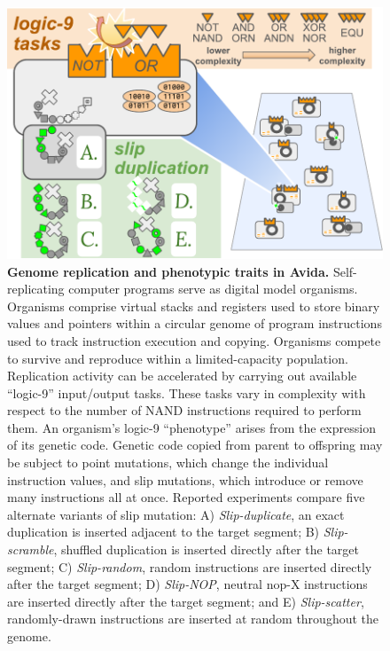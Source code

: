 \begin{figure}[!ht]
\centering
\includegraphics[width=\linewidth]{imgs/GeneDupeOps.pdf}
\caption{%
\textbf{Genome replication and phenotypic traits in Avida.}
\footnotesize
Self-replicating computer programs serve as digital model organisms.
Organisms comprise virtual stacks and registers used to store binary values and pointers within a circular genome of program instructions used to track instruction execution and copying.
Organisms compete to survive and reproduce within a limited-capacity population.
Replication activity can be accelerated by carrying out available ``logic-9'' input/output tasks.
These tasks vary in complexity with respect to the number of NAND instructions required to perform them.
An organism's logic-9 ``phenotype'' arises from the expression of its genetic code.
Genetic code copied from parent to offspring may be subject to point mutations, which change the individual instruction values, and slip mutations, which introduce or remove many instructions all at once.
Reported experiments compare five alternate variants of slip mutation:
A) \textit{Slip-duplicate}, an exact duplication is inserted adjacent to the target segment;
B) \textit{Slip-scramble}, shuffled duplication is inserted directly after the target segment;
C) \textit{Slip-random}, random instructions are inserted directly after the target segment;
D) \textit{Slip-NOP}, neutral nop-X instructions are inserted directly after the target segment; and
E) \textit{Slip-scatter}, randomly-drawn instructions are inserted at random throughout the genome.
}
\label{fig:slip_mut_variants}
\end{figure}